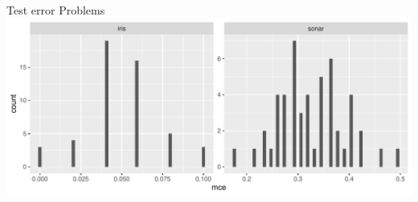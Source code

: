 \documentclass[11pt,compress,t,notes=noshow, xcolor=table]{beamer}
\begin{document}
\begin{vbframe}{Test error Problems}
\includegraphics[width=\textwidth]{figure/test-error-flucuation} 

\end{vbframe}



\end{document}
